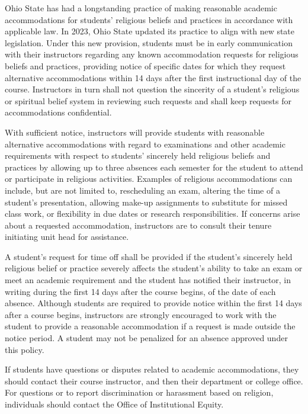 \documentclass[12pt]{amsart}
\begin{document}
Ohio State has had a longstanding practice of making reasonable academic
accommodations for students' religious beliefs and practices in accordance with
applicable law. In 2023, Ohio State updated its practice to align with new
state legislation. Under this new provision, students must be in early
communication with their instructors regarding any known accommodation requests
for religious beliefs and practices, providing notice of specific dates for
which they request alternative accommodations within 14 days after the first
instructional day of the course. Instructors in turn shall not question the
sincerity of a student's religious or spiritual belief system in reviewing such
requests and shall keep requests for accommodations confidential.

With sufficient notice, instructors will provide students with reasonable
alternative accommodations with regard to examinations and other academic
requirements with respect to students' sincerely held religious beliefs and
practices by allowing up to three absences each semester for the student to
attend or participate in religious activities. Examples of religious
accommodations can include, but are not limited to, rescheduling an exam,
altering the time of a student's presentation, allowing make-up assignments to
substitute for missed class work, or flexibility in due dates or research
responsibilities. If concerns arise about a requested accommodation,
instructors are to consult their tenure initiating unit head for assistance.

A student's request for time off shall be provided if the student's sincerely
held religious belief or practice severely affects the student's ability to
take an exam or meet an academic requirement and the student has notified their
instructor, in writing during the first 14 days after the course begins, of the
date of each absence. Although students are required to provide notice within
the first 14 days after a course begins, instructors are strongly encouraged to
work with the student to provide a reasonable accommodation if a request is
made outside the notice period. A student may not be penalized for an absence
approved under this policy.

If students have questions or disputes related to academic accommodations, they
should contact their course instructor, and then their department or college
office. For questions or to report discrimination or harassment based on
religion, individuals should contact the Office of Institutional Equity.
\end{document}
